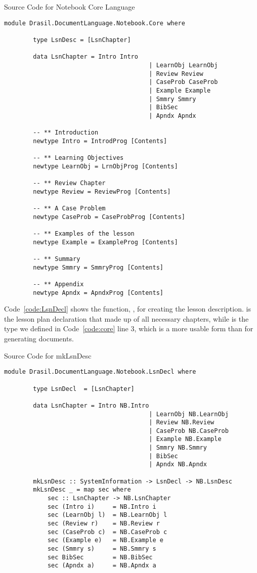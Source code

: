 \begin{listing}[h!]
	\caption{Source Code for Notebook Core Language}
	\label{code:core}
	\begin{lstlisting}[language=haskell1]
		module Drasil.DocumentLanguage.Notebook.Core where
		
		type LsnDesc = [LsnChapter]

		data LsnChapter = Intro Intro
										| LearnObj LearnObj
										| Review Review
										| CaseProb CaseProb
										| Example Example
										| Smmry Smmry
										| BibSec
										| Apndx Apndx
		
		-- ** Introduction
		newtype Intro = IntrodProg [Contents]
		
		-- ** Learning Objectives
		newtype LearnObj = LrnObjProg [Contents]
		
		-- ** Review Chapter
		newtype Review = ReviewProg [Contents]
		
		-- ** A Case Problem
		newtype CaseProb = CaseProbProg [Contents]
		
		-- ** Examples of the lesson
		newtype Example = ExampleProg [Contents]
		
		-- ** Summary
		newtype Smmry = SmmryProg [Contents]
		
		-- ** Appendix
		newtype Apndx = ApndxProg [Contents]
	\end{lstlisting}
\end{listing}

Code~\ref{code:LsnDecl} shows the function, , for creating 
the lesson description.  is the lesson plan declaration that 
made up of all necessary chapters, while  is 
the type we defined in Code~\ref{code:core} line 3, which is a more usable form 
than  for generating documents.

\begin{listing}[h]
	\caption{Source Code for mkLsnDesc}
	\label{code:LsnDecl}
	\begin{lstlisting}[language=haskell1]
		module Drasil.DocumentLanguage.Notebook.LsnDecl where
		
		type LsnDecl  = [LsnChapter]
		
		data LsnChapter = Intro NB.Intro
										| LearnObj NB.LearnObj
										| Review NB.Review
										| CaseProb NB.CaseProb
										| Example NB.Example
										| Smmry NB.Smmry
										| BibSec
										| Apndx NB.Apndx
		
		mkLsnDesc :: SystemInformation -> LsnDecl -> NB.LsnDesc
		mkLsnDesc _ = map sec where
			sec :: LsnChapter -> NB.LsnChapter
			sec (Intro i)     = NB.Intro i
			sec (LearnObj l)  = NB.LearnObj l
			sec (Review r)    = NB.Review r  
			sec (CaseProb c)  = NB.CaseProb c
			sec (Example e)   = NB.Example e  
			sec (Smmry s)     = NB.Smmry s
			sec BibSec        = NB.BibSec
			sec (Apndx a)     = NB.Apndx a
	\end{lstlisting}
\end{listing}

